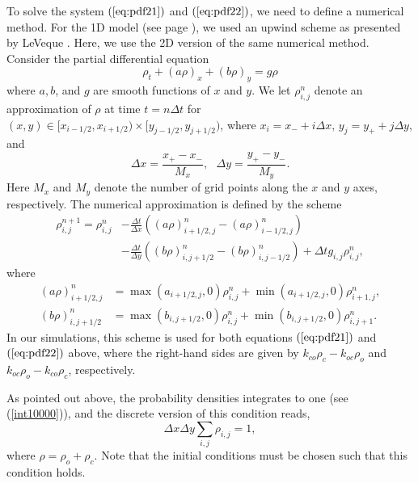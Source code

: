 To solve the system $(\ref{eq:pdf21})$ and $(\ref{eq:pdf22})$, we need to
define a numerical method. For the 1D model (see page \pageref{npdf}), we used
an upwind scheme as presented by LeVeque \cite{LeVeque2002}. Here,
we use the 2D version of the same numerical method. Consider the partial
differential equation
\[
\rho_{t}+(a\rho)_{x}+\left(  b\rho\right)  _{y}=g\rho
\]
where $a,b$, and $g$ are smooth functions of $x$ and $y.$ We let $\rho
_{i,j}^{n}$ denote an approximation of $\rho$ at time $t=n\Delta t$ for
$(x,y)\in\lbrack x_{i-1/2},x_{i+1/2})\times\lbrack y_{j-1/2},y_{j+1/2})$, where
$x_{i}=x_{-}+i\Delta x,\, y_{j}=y_{+}+j\Delta y$, and%
\[
\Delta x=\frac{x_{+}-x_{-}}{M_{x}},\text{ }\Delta y=\frac{y_{+}-y_{-}}{M_{y}}.
\]
Here $M_{x}$ and $M_{y}$ denote the number of grid points along the $x$ and $y$
axes, respectively. The numerical approximation is defined by the scheme%
\begin{align}
\rho_{i,j}^{n+1}=\rho_{i,j}^{n} &  -\frac{\Delta t}{\Delta x}\left(  \left(
a\rho\right)  _{i+1/2,j}^{n}-\left(  a\rho\right)  _{i-1/2,j}^{n}\right)
\nonumber\\
&  -\frac{\Delta t}{\Delta y}\left(  \left(  b\rho\right)  _{i,j+1/2}%
^{n}-\left(  b\rho\right)  _{i,j-1/2}^{n}\right)  +\Delta tg_{i,j}\rho
_{i,j}^{n}, \label{eq:scheme2D}%
\end{align}
where%
\begin{align}
\left(  a\rho\right)  _{i+1/2,j}^{n} &  =\max(a_{i+1/2,j},0)\rho_{i,j}%
^{n}+\min(a_{i+1/2,j},0)\rho_{i+1,j}^{n},\label{eq:flux_x}\\
\left(  b\rho\right)  _{i,j+1/2}^{n} &  =\max(b_{i,j+1/2},0)\rho_{i,j}%
^{n}+\min(b_{i,j+1/2},0)\rho_{i,j+1}^{n}.\label{eq:flux_y}%
\end{align}
In our simulations, this scheme is used for both equations $(\ref{eq:pdf21})$
and $(\ref{eq:pdf22})$ above, where the right-hand sides are given by
$k_{co}\rho_{c}-k_{oc}\rho_{o}$ and $k_{oc}\rho_{o}-k_{co}\rho_{c}$,
respectively. 

As pointed out above, the probability densities integrates to one (see (\ref{int10000})), and the discrete version of this condition
reads,
\begin{equation}
\Delta x \Delta y \sum_{i,j}  \rho_{i,j}=1,  \label{discrete_sumone}
\end{equation}
where $\rho=\rho_{o}+\rho_{c}$.  Note that the initial conditions must be chosen such that this condition holds.



